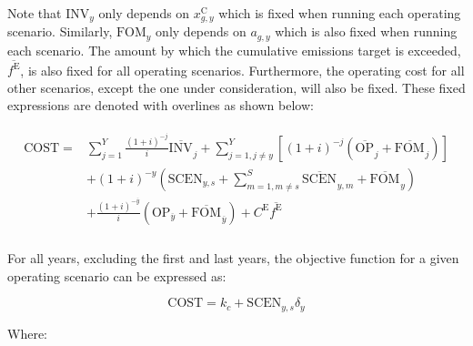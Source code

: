 \documentclass{article}
\newcommand{\sYears}{Y}
\newcommand{\sScenarios}{S}
\newcommand{\iGenerator}{g}
\newcommand{\iYear}{y}
\newcommand{\iYearTerminal}{\overline{\iYear}}
\newcommand{\iYearAlias}{j}
\newcommand{\iScenario}{s}
\newcommand{\iScenarioAlias}{m}
\newcommand{\cOperatingCost}[1][\iYear,\iScenario]{\mathrm{OP}_{#1}}
\newcommand{\cFixedOperationsMaintenanceCost}[1][\iYear]{\mathrm{FOM}_{#1}}
\newcommand{\cInvestmentCost}[1][\iYear]{\mathrm{INV}_{#1}}
\newcommand{\cInterestRate}{i}
\newcommand{\cEmissionsTargetViolationPenalty}{C^{\mathrm{E}}}
\newcommand{\cObjectiveFunction}{\mathrm{COST}}
\newcommand{\cOperatingCostScenario}[1][\iYear,\iScenario]{\mathrm{SCEN}_{#1}}
\newcommand{\cDiscountRate}[1][\iYear]{\delta_{#1}}
\newcommand{\vInstalledCapacity}[1][\iGenerator,\iYear]{x^{\mathrm{C}}_{#1}}
\newcommand{\vEmissionsTargetViolation}{f^{\mathrm{E}}}
\newcommand{\vInstalledCapacityTotal}[1][\iGenerator,\iYear]{a_{#1}}
\begin{document}
Note that $\cInvestmentCost$ only depends on $\vInstalledCapacity$ which is fixed when running each operating scenario. Similarly, $\cFixedOperationsMaintenanceCost$ only depends on $\vInstalledCapacityTotal$ which is also fixed when running each scenario. The amount by which the cumulative emissions target is exceeded, $\overline{\vEmissionsTargetViolation}$, is also fixed for all operating scenarios. Furthermore, the operating cost for all other scenarios, except the one under consideration, will also be fixed. These fixed expressions are denoted with overlines as shown below:

\begin{align}
	\begin{split}
		\cObjectiveFunction = & \sum\limits_{\iYearAlias=1}^{\sYears} \frac{(1+\cInterestRate)^{-\iYearAlias}}{\cInterestRate}\overline{\cInvestmentCost[]}_{\iYearAlias} + \sum\limits_{\iYearAlias=1, \iYearAlias \neq \iYear}^{\sYears} \left[(1+\cInterestRate)^{-\iYearAlias} (\overline{\cOperatingCost[]}_{\iYearAlias} + \overline{\cFixedOperationsMaintenanceCost[]}_{\iYearAlias}) \right]\\
		& + (1 + \cInterestRate)^{-\iYear}\left(\cOperatingCostScenario + \sum\limits_{\iScenarioAlias = 1,\iScenarioAlias\neq \iScenario}^{\sScenarios}\overline{\cOperatingCostScenario[]}_{\iYear,\iScenarioAlias} + \overline{\cFixedOperationsMaintenanceCost[]}_{\iYear}\right)\\
		& + \frac{(1+\cInterestRate)^{-\iYearTerminal}}{\cInterestRate} \left(\cOperatingCost[\iYearTerminal] + \overline{\cFixedOperationsMaintenanceCost[]}_{\iYearTerminal} \right) + \cEmissionsTargetViolationPenalty \overline{\vEmissionsTargetViolation}\\
	\end{split}
\end{align}


For all years, excluding the first and last years, the objective function for a given operating scenario can be expressed as:

\begin{equation}
	\cObjectiveFunction = k_{c} + \cOperatingCostScenario\cDiscountRate
\end{equation}

Where:
\end{document}
